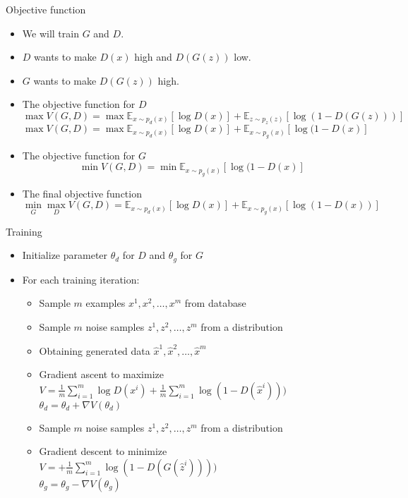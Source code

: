 \documentclass[handout]{beamer}
\begin{document}
\begin{frame}[<+->]{Objective function}
	\begin{itemize}
		\item We will train $G$ and $D$.
		\item \(D\) wants to make \(D(x)\) high and \(D(G(z))\) low.
		\item \(G\) wants to make \(D(G(z))\) high.
		\item The objective function for $D$
			$$\max V(G, D) = \max \mathbb{E}_{x \sim p_{d}(x)}[\log D(x)] + \mathbb{E}_{z \sim p_z(z)}[\log (1 - D(G(z)))]$$
			$$\max V(G, D) = \max \mathbb{E}_{x \sim p_{d}(x)}[\log D(x)] + \mathbb{E}_{x \sim p_g(x)}[\log (1 - D(x)]$$
		\item The objective function for $G$
			$$\min V(G, D) = \min \mathbb{E}_{x \sim p_g(x)}[\log (1 - D(x)]$$
		\item The final objective function
			$$\min_G \max_D V(G,D) = \mathbb{E}_{x \sim p_{d}(x)}[\log D(x)] + \mathbb{E}_{x \sim p_g(x)}[\log (1 - D(x))]$$
	\end{itemize}
\end{frame}

\begin{frame}[<+->]{Training}
	\begin{itemize}
		\item Initialize parameter $\theta_d$ for $D$ and $\theta_g$ for $G$
		\item For each training iteration:
			\begin{itemize}
				\item Sample $m$ examples ${x^1, x^2, \dots, x^m}$ from database
				\item Sample $m$ noise samples ${z^1, z^2, \dots, z^m}$ from a distribution
				\item Obtaining generated data ${\hat{x}^1, \hat{x}^2, \dots, \hat{x}^m}$
				\item Gradient ascent to maximize \\
					$V = \frac{1}{m}\sum_{i=1}^{m}\log D(x^i) + \frac{1}{m}\sum_{i=1}^{m}\log (1 - D(\hat{x}^i)))$ \\
					$\theta_d = \theta_d + \nabla V(\theta_d)$
				\item Sample $m$ noise samples ${z^1, z^2, \dots, z^m}$ from a distribution
				\item Gradient descent to minimize \\
				$V = + \frac{1}{m}\sum_{i=1}^{m}\log (1 - D(G(\hat{z}^i))))$ \\
				$\theta_g = \theta_g - \nabla V(\theta_g)$
			\end{itemize}
	\end{itemize}
\end{frame}
\end{document}
